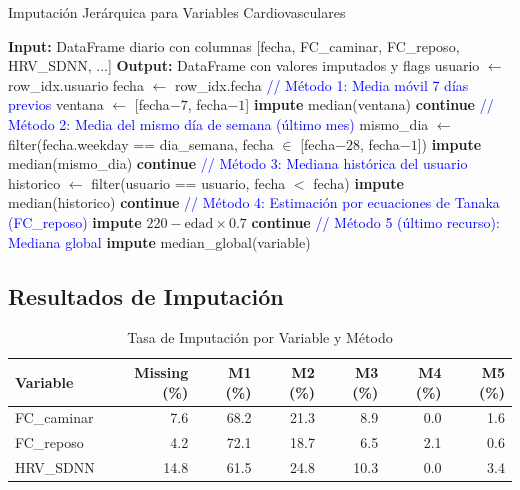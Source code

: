 \documentclass[12pt,letterpaper,twoside]{report}
\begin{document}
\begin{algorithm}[H]
\caption{Imputación Jerárquica para Variables Cardiovasculares}
\label{alg:hierarchical_imputation}
\begin{algorithmic}[1]
\State \textbf{Input:} DataFrame diario con columnas [fecha, FC\_caminar, FC\_reposo, HRV\_SDNN, ...]
\State \textbf{Output:} DataFrame con valores imputados y flags
\State
{}
        \State usuario $\gets$ row\_idx.usuario
        \State fecha $\gets$ row\_idx.fecha
        \State
        \State \textcolor{blue}{// Método 1: Media móvil 7 días previos}
        \State ventana $\gets$ [fecha$-7$, fecha$-1$]
            \State \textbf{impute} median(ventana) 
            \State \textbf{continue}
        \EndIf
        \State
        \State \textcolor{blue}{// Método 2: Media del mismo día de semana (último mes)}
        \State mismo\_dia $\gets$ filter(fecha.weekday == dia\_semana, fecha $\in$ [fecha$-28$, fecha$-1$])
            \State \textbf{impute} median(mismo\_dia)
            \State \textbf{continue}
        \EndIf
        \State
        \State \textcolor{blue}{// Método 3: Mediana histórica del usuario}
        \State historico $\gets$ filter(usuario == usuario, fecha $<$ fecha)
            \State \textbf{impute} median(historico)
            \State \textbf{continue}
        \EndIf
        \State
        \State \textcolor{blue}{// Método 4: Estimación por ecuaciones de Tanaka (FC\_reposo)}
            \State \textbf{impute} $220 - \text{edad} \times 0.7$ 
            \State \textbf{continue}
        \EndIf
        \State
        \State \textcolor{blue}{// Método 5 (último recurso): Mediana global}
        \State \textbf{impute} median\_global(variable)
    \EndFor
\EndFor
\end{algorithmic}
\end{algorithm}

\subsection{Resultados de Imputación}

\begin{table}[H]
\centering
\caption{Tasa de Imputación por Variable y Método}
\label{tab:imputation_rates}
\begin{tabular}{@{}lrrrrrr@{}}
\toprule
\textbf{Variable} & \textbf{Missing (\%)} & \textbf{M1 (\%)} & \textbf{M2 (\%)} & \textbf{M3 (\%)} & \textbf{M4 (\%)} & \textbf{M5 (\%)} \\
\midrule
FC\_caminar   & 7.6 & 68.2 & 21.3 & 8.9  & 0.0 & 1.6 \\
FC\_reposo    & 4.2 & 72.1 & 18.7 & 6.5  & 2.1 & 0.6 \\
HRV\_SDNN     & 14.8 & 61.5 & 24.8 & 10.3 & 0.0 & 3.4 \\
\bottomrule
\end{tabular}
\end{table}
\end{document}
